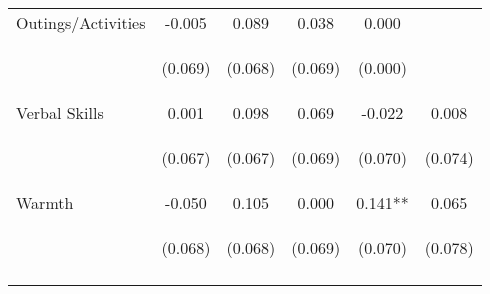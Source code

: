 \begin{tabular}{lccccc}
\noalign{\smallskip}Outings/Activities & -0.005 & 0.089 & 0.038 & 0.000 & \\
 & \begin{footnotesize}(0.069)\end{footnotesize} & \begin{footnotesize}(0.068)\end{footnotesize} & \begin{footnotesize}(0.069)\end{footnotesize} & \begin{footnotesize}(0.000)\end{footnotesize} & \begin{footnotesize}\end{footnotesize}\\
\noalign{\smallskip}Verbal Skills & 0.001 & 0.098 & 0.069 & -0.022 & 0.008\\
 & \begin{footnotesize}(0.067)\end{footnotesize} & \begin{footnotesize}(0.067)\end{footnotesize} & \begin{footnotesize}(0.069)\end{footnotesize} & \begin{footnotesize}(0.070)\end{footnotesize} & \begin{footnotesize}(0.074)\end{footnotesize}\\
\noalign{\smallskip}Warmth & -0.050 & 0.105 & 0.000 & 0.141** & 0.065\\
 & \begin{footnotesize}(0.068)\end{footnotesize} & \begin{footnotesize}(0.068)\end{footnotesize} & \begin{footnotesize}(0.069)\end{footnotesize} & \begin{footnotesize}(0.070)\end{footnotesize} & \begin{footnotesize}(0.078)\end{footnotesize}\\
\noalign{\smallskip}\hline\end{tabular}\\
